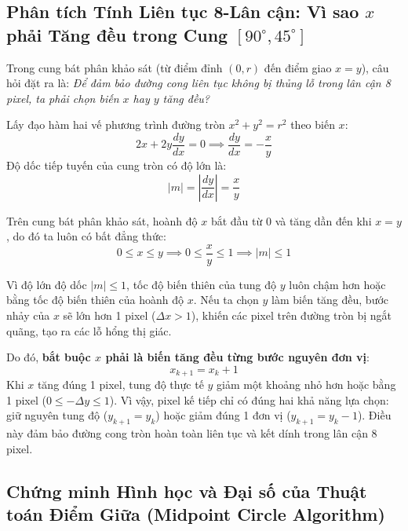 \subsection{Phân tích Tính Liên tục 8-Lân cận: Vì sao \texorpdfstring{$x$}{x} phải Tăng đều trong Cung \texorpdfstring{$[90^\circ, 45^\circ]$}{[90, 45] độ}}
\label{subsec:w4_circle_8conn}

Trong cung bát phân khảo sát (từ điểm đỉnh $(0, r)$ đến điểm giao $x = y$), câu hỏi đặt ra là: \textit{Để đảm bảo đường cong liên tục không bị thủng lỗ trong lân cận 8 pixel, ta phải chọn biến $x$ hay $y$ tăng đều?}

Lấy đạo hàm hai vế phương trình đường tròn $x^2 + y^2 = r^2$ theo biến $x$:
\begin{equation}
2x + 2y \frac{dy}{dx} = 0 \implies \frac{dy}{dx} = -\frac{x}{y}
\end{equation}
Độ dốc tiếp tuyến của cung tròn có độ lớn là:
\begin{equation}
|m| = \left|\frac{dy}{dx}\right| = \frac{x}{y}
\end{equation}

Trên cung bát phân khảo sát, hoành độ $x$ bắt đầu từ $0$ và tăng dần đến khi $x = y$, do đó ta luôn có bất đẳng thức:
\begin{equation}
0 \le x \le y \implies 0 \le \frac{x}{y} \le 1 \implies |m| \le 1
\end{equation}

Vì độ lớn độ dốc $|m| \le 1$, tốc độ biến thiên của tung độ $y$ luôn chậm hơn hoặc bằng tốc độ biến thiên của hoành độ $x$. Nếu ta chọn $y$ làm biến tăng đều, bước nhảy của $x$ sẽ lớn hơn 1 pixel ($\Delta x > 1$), khiến các pixel trên đường tròn bị ngắt quãng, tạo ra các lỗ hổng thị giác.

Do đó, \textbf{bắt buộc $x$ phải là biến tăng đều từng bước nguyên đơn vị}:
\begin{equation}
x_{k+1} = x_k + 1
\end{equation}
Khi $x$ tăng đúng 1 pixel, tung độ thực tế $y$ giảm một khoảng nhỏ hơn hoặc bằng 1 pixel ($0 \le -\Delta y \le 1$). Vì vậy, pixel kế tiếp chỉ có đúng hai khả năng lựa chọn: giữ nguyên tung độ ($y_{k+1} = y_k$) hoặc giảm đúng 1 đơn vị ($y_{k+1} = y_k - 1$). Điều này đảm bảo đường cong tròn hoàn toàn liên tục và kết dính trong lân cận 8 pixel.

\subsection{Chứng minh Hình học và Đại số của Thuật toán Điểm Giữa (Midpoint Circle Algorithm)}
\label{subsec:w4_midpoint}


